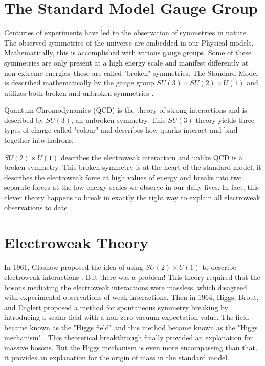 \section{The Standard Model Gauge Group} 

Centuries of experiments have led to the observation of symmetries in nature. The observed symmetries of the universe are embedded in our Physical models. Mathematically, this is accomplished with various gauge groups. Some of these symmetries are only present at a high energy scale and manifest differently at non-extreme energies--these are called "broken" symmetries. The Standard Model is described mathematically by the gauge group $SU(3)\times SU(2) \times U(1)$ and utilizes both broken and unbroken symmetries \cite{Langacker}.

Quantum Chromodynamics (QCD) is the theory of strong interactions and is described by $SU(3)$, an unbroken symmetry. This $SU(3)$ theory yields three types of charge called "colour" and describes how quarks interact and bind together into hadrons.

$SU(2)\times U(1)$ describes the electroweak interaction and unlike QCD is a broken symmetry. This broken symmetry is at the heart of the standard model, it describes the electroweak force at high values of energy and breaks into two separate forces at the low energy scales we observe in our daily lives. In fact, this clever theory happens to break in exactly the right way to explain all electroweak observations to date \cite{Griffiths}.

\section{Electroweak Theory}

In 1961, Glashow proposed the idea of using $SU(2)\times U(1)$ to describe electroweak interactions \cite{Glashow}. But there was a problem! This theory required that the bosons mediating the electroweak interactions were massless, which disagreed with experimental observations of weak interactions. Then in 1964, Higgs, Brout, and Englert proposed a method for spontaneous symmetry breaking by introducing a scalar field with a non-zero vacuum expectation value. The field became known as the "Higgs field" and this method became known as the "Higgs mechanism" \cite{BroutEnglert, Higgs}. This theoretical breakthrough finally provided an explanation for massive bosons. But the Higgs mechanism is even more encompassing than that, it provides an explanation for the origin of mass in the standard model.

